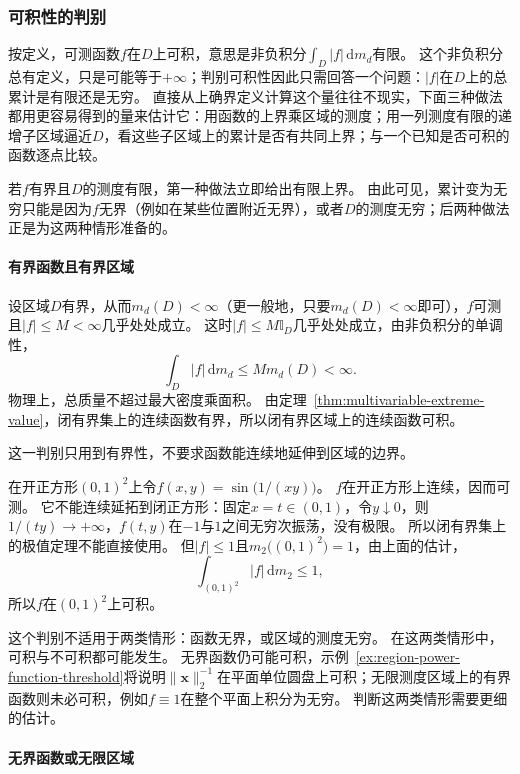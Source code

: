 \subsubsection{可积性的判别}

按定义，可测函数$f$在$D$上可积，意思是非负积分$\int_D|f|\,\mathrm dm_d$有限。
这个非负积分总有定义，只是可能等于$+\infty$；判别可积性因此只需回答一个问题：$|f|$在$D$上的总累计是有限还是无穷。
直接从上确界定义计算这个量往往不现实，下面三种做法都用更容易得到的量来估计它：用函数的上界乘区域的测度；用一列测度有限的递增子区域逼近$D$，看这些子区域上的累计是否有共同上界；与一个已知是否可积的函数逐点比较。

若$f$有界且$D$的测度有限，第一种做法立即给出有限上界。
由此可见，累计变为无穷只能是因为$f$无界（例如在某些位置附近无界），或者$D$的测度无穷；后两种做法正是为这两种情形准备的。

\paragraph{有界函数且有界区域}

设区域$D$有界，从而$m_d(D)<\infty$（更一般地，只要$m_d(D)<\infty$即可），$f$可测且$|f|\leq M<\infty$几乎处处成立。
这时$|f|\leq M\mathbb I_D$几乎处处成立，由非负积分的单调性，
\[
 \int_D|f|\,\mathrm dm_d\leq M m_d(D)<\infty.
\]
物理上，总质量不超过最大密度乘面积。
由定理~\ref{thm:multivariable-extreme-value}，闭有界集上的连续函数有界，所以闭有界区域上的连续函数可积。

这一判别只用到有界性，不要求函数能连续地延伸到区域的边界。
\begin{example}[开正方形上剧烈振荡的有界函数可积]
\label{ex:region-bounded-oscillation}
在开正方形$(0,1)^2$上令$f(x,y)=\sin\bigl(1/(xy)\bigr)$。
$f$在开正方形上连续，因而可测。
它不能连续延拓到闭正方形：固定$x=t\in(0,1)$，令$y\downarrow0$，则$1/(ty)\to+\infty$，$f(t,y)$在$-1$与$1$之间无穷次振荡，没有极限。
所以闭有界集上的极值定理不能直接使用。
但$|f|\leq1$且$m_2\bigl((0,1)^2\bigr)=1$，由上面的估计，
\[
 \int_{(0,1)^2}|f|\,\mathrm dm_2\leq1,
\]
所以$f$在$(0,1)^2$上可积。
\end{example}

这个判别不适用于两类情形：函数无界，或区域的测度无穷。
在这两类情形中，可积与不可积都可能发生。
无界函数仍可能可积，示例~\ref{ex:region-power-function-threshold}将说明$\lVert\bm x\rVert_2^{-1}$在平面单位圆盘上可积；无限测度区域上的有界函数则未必可积，例如$f\equiv1$在整个平面上积分为无穷。
判断这两类情形需要更细的估计。

\paragraph{无界函数或无限区域}

